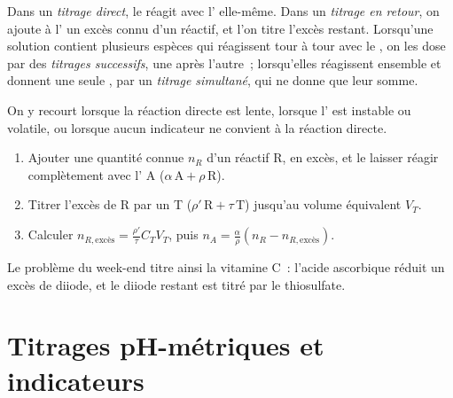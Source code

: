 \begin{definition}\label{def:b1:titration-methods:kinds}
Dans un \emph{titrage direct}, le 
réagit avec l' elle-même. Dans un \emph{titrage en
retour}, on ajoute à l' un excès connu d'un réactif, et
l'on titre l'excès restant. Lorsqu'une solution contient plusieurs
espèces qui réagissent tour à tour avec le , on les dose
par des \emph{titrages successifs}, une
 après l'autre~; lorsqu'elles réagissent ensemble et donnent
une seule , par un \emph{titrage simultané},
qui ne donne que leur somme.
\end{definition}

\begin{method}\label{met:b1:titration-methods:back-titration}
On y recourt lorsque la réaction directe est lente, lorsque l' est instable ou volatile, ou lorsque aucun indicateur ne convient
à la réaction directe.
\begin{enumerate}
  \item Ajouter une quantité connue $n_R$ d'un réactif R, en excès, et le
        laisser réagir complètement avec l' A
        ($\alpha\,\mathrm{A} + \rho\,\mathrm{R}$).
  \item Titrer l'excès de R par un  T ($\rho'\,\mathrm{R} +
        \tau\,\mathrm{T}$) jusqu'au volume équivalent $V_T$.
  \item Calculer $n_{R,\text{excès}} = \frac{\rho'}{\tau}C_TV_T$, puis
        $n_A = \frac{\alpha}{\rho}(n_R - n_{R,\text{excès}})$.
\end{enumerate}
\end{method}

Le problème du week-end titre ainsi la vitamine C~: l'acide ascorbique
réduit un excès de diiode, et le diiode restant est titré par le
thiosulfate.

\section{Titrages pH-métriques et indicateurs}

